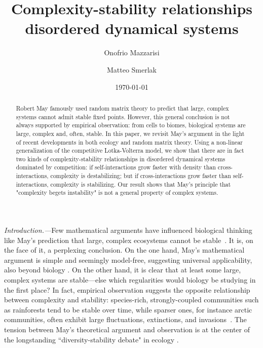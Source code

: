 \documentclass[
 prl,
 twocolumn,
 amsmath,
 amssymb,
 aps,
]{revtex4-2}
\begin{document}
\title{Complexity-stability relationships disordered dynamical systems}

\author{Onofrio Mazzarisi}

\author{Matteo Smerlak}


\date{\today}

\begin{abstract}
    Robert May famously used random matrix theory to predict that large, complex systems cannot admit stable fixed points. 
    However, this general conclusion is not always supported by empirical observation: from cells to biomes, biological systems are large, complex and, often, stable.
    In this paper, we revisit May's argument in the light of recent developments in both ecology and random matrix theory. 
    Using a non-linear generalization of the competitive Lotka-Volterra model, we show that there are in fact two kinds of complexity-stability relationships in disordered dynamical systems dominated by competition:
    if self-interactions grow faster with density than cross-interactions, complexity is destabilizing; but if cross-interactions grow faster than self-interactions, complexity is stabilizing.
    Our result shows that May's principle that "complexity begets instability" is not a general property of complex systems.
\end{abstract}

\maketitle

\paragraph*{}
\emph{Introduction.---}Few mathematical arguments have influenced biological thinking like May's prediction that large, complex ecosystems cannot be stable~\cite{May1972}.
It is, on the face of it, a perplexing conclusion.
On the one hand, May's mathematical argument is simple and seemingly model-free, suggesting universal applicability, also beyond biology \cite{Haldane2011, Moran2019}.
On the other hand, it is clear that at least some large, complex systems are stable---else which regularities would biology be studying in the first place? 
In fact, empirical observation suggests the opposite relationship between complexity and stability: species-rich, strongly-coupled communities such as rainforests tend to be stable over time, while sparser ones, for instance arctic communities, often exhibit large fluctuations, extinctions, and invasions~\cite{Hutchinson1959,Odum1959,MacArthur1955}. 
The tension between May's theoretical argument and observation is at the center of the longstanding ``diversity-stability debate" in ecology \cite{McCann2000, Loreau2022}.
\end{document}
